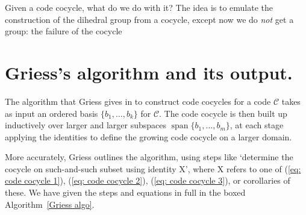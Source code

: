 \documentclass{article}
\theoremstyle{plain}
\theoremstyle{definition}
\def \cC {\mathcal{C}}
\DeclareMathOperator{\Span}{span}
\begin{document}
Given a code cocycle, what do we do with it? 
The idea is to emulate the construction of the dihedral group from a cocycle, except now we do \emph{not} get a group: the failure of the cocycle 

\section{Griess's algorithm and its output.}

The algorithm that Griess gives in \cite[Theorem 10]{Griess} to construct code cocycles for a code $\cC$ takes as input an ordered  basis $\{b_1,\ldots,b_k\}$ for $\cC$. 
The code cocycle is then built up inductively over larger and larger subspaces $\Span\{b_1,\ldots,b_m\}$, at each stage applying the identities to define the growing code cocycle on a larger domain.

More accurately, Griess outlines the algorithm, using steps like `determine the cocycle on such-and-such subset using identity X', where X refers to one of (\ref{eq: code cocycle 1}), (\ref{eq: code cocycle 2}), (\ref{eq: code cocycle 3}), or corollaries of these. We have given the steps and equations in full in the boxed Algorithm~\ref{Griess algo}.


\end{document}

